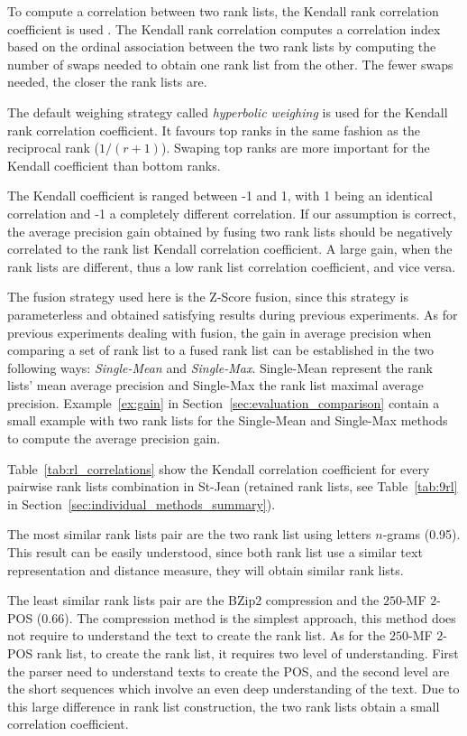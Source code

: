 To compute a correlation between two rank lists, the Kendall rank correlation coefficient is used \cite{scipy}.
The Kendall rank correlation computes a correlation index based on the ordinal association between the two rank lists by computing the number of swaps needed to obtain one rank list from the other.
The fewer swaps needed, the closer the rank lists are.

The default weighing strategy called \textit{hyperbolic weighing} is used for the Kendall rank correlation coefficient.
It favours top ranks in the same fashion as the reciprocal rank ($1 / (r + 1)$).
Swaping top ranks are more important for the Kendall coefficient than bottom ranks.

The Kendall coefficient is ranged between -1 and 1, with 1 being an identical correlation and -1 a completely different correlation.
If our assumption is correct, the average precision gain obtained by fusing two rank lists should be negatively correlated to the rank list Kendall correlation coefficient.
A large gain, when the rank lists are different, thus a low rank list correlation coefficient, and vice versa.

The fusion strategy used here is the Z-Score fusion, since this strategy is parameterless and obtained satisfying results during previous experiments.
As for previous experiments dealing with fusion, the gain in average precision when comparing a set of rank list to a fused rank list can be established in the two following ways: \textit{Single-Mean} and \textit{Single-Max}.
Single-Mean represent the rank lists' mean average precision and Single-Max the rank list maximal average precision.
Example~\ref{ex:gain} in Section~\ref{sec:evaluation_comparison} contain a small example with two rank lists for the Single-Mean and Single-Max methods to compute the average precision gain.

Table~\ref{tab:rl_correlations} show the Kendall correlation coefficient for every pairwise rank lists combination in St-Jean (retained rank lists, see Table~\ref{tab:9rl} in Section~\ref{sec:individual_methods_summary}).

The most similar rank lists pair are the two rank list using letters $n$-grams (0.95).
This result can be easily understood, since both rank list use a similar text representation and distance measure, they will obtain similar rank lists.

The least similar rank lists pair are the BZip2 compression and the $250$-MF $2$-POS (0.66).
The compression method is the simplest approach, this method does not require to understand the text to create the rank list.
As for the $250$-MF $2$-POS rank list, to create the rank list, it requires two level of understanding.
First the parser need to understand texts to create the POS, and the second level are the short sequences which involve an even deep understanding of the text.
Due to this large difference in rank list construction, the two rank lists obtain a small correlation coefficient.

